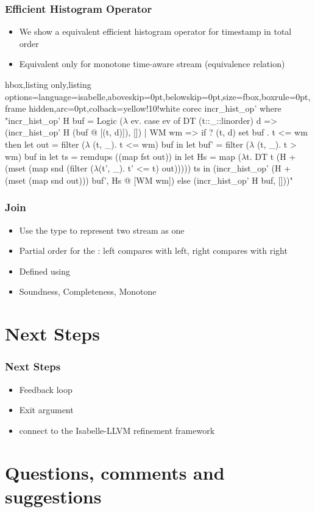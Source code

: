 \documentclass[aspectratio=169,10pt]{beamer}
\begin{document}
\begin{frame}[fragile]
  \frametitle{Efficient Histogram Operator}
  \begin{itemize}
    \item We show a equivalent efficient histogram operator for timestamp in total order
    \item Equivalent only for monotone time-aware stream (equivalence relation)
  \end{itemize}
\vspace*{-1ex}
\begin{tcblisting}{hbox,listing only,listing options={language=isabelle,aboveskip=0pt,belowskip=0pt},size=fbox,boxrule=0pt,frame hidden,arc=0pt,colback=yellow!10!white}
corec incr_hist_op' where
  "incr_hist_op' H buf = Logic ($\lambda$ ev. case ev of
    DT (t::_::linorder) d => (incr_hist_op' H (buf @ [(t, d)]), [])
  | WM wm => if ? (t, d) \in set buf . t <= wm
    then let out = filter ($\lambda$ (t, _). t <= wm) buf in
      let buf' = filter ($\lambda$ (t, _). t > wm) buf in
      let ts = remdups ((map fst out)) in
      let Hs = map
        ($\lambda$t. DT t (H + (mset (map snd (filter ($\lambda$(t', _). t' <= t) out)))))
        ts in
      (incr_hist_op' (H + (mset (map snd out))) buf', Hs @ [WM wm])
    else (incr_hist_op' H buf, []))"
\end{tcblisting}
\vspace*{-1ex}
\end{frame}

\begin{frame}[fragile]
  \frametitle{Join}
  \begin{itemize}
    \item Use the  type to represent two stream as one
    \item Partial order for the : left compares with left, right compares with right
    \item Defined using 
    \item Soundness, Completeness, Monotone
  \end{itemize}
\end{frame}

\section{Next Steps}

\begin{frame}
  \frametitle{Next Steps}
  \begin{itemize}
    \item Feedback loop
    \item Exit argument
    \item connect to the Isabelle-LLVM refinement framework
  \end{itemize}
\end{frame}

\section{Questions, comments and suggestions}
\end{document}
